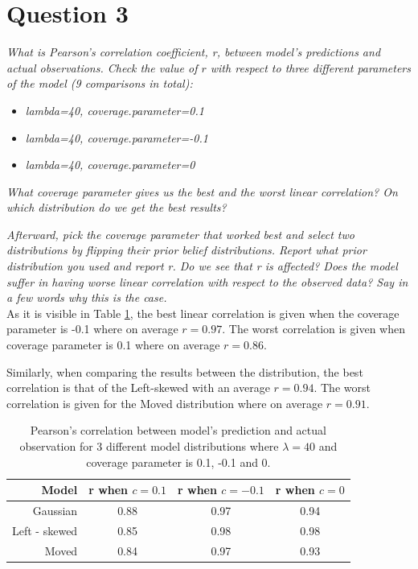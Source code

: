 \documentclass[11pt,a4paper,oneside]{article}
\begin{document}
\section{Question 3}
\label{Question 3}
\textit{What is Pearson’s correlation coefficient, r, between model’s predictions and actual observations. Check the value of $r$ with respect to three different parameters of the model (9 comparisons in total):}

\begin{itemize}
    \item \textit{lambda=40, coverage.parameter=0.1}
    \item \textit{lambda=40, coverage.parameter=-0.1}
    \item \textit{lambda=40, coverage.parameter=0}
\end{itemize}

\textit{What coverage parameter gives us the best and the worst linear correlation? On which distribution do we get the best results?}

\textit{Afterward, pick the coverage parameter that worked best and select two distributions by flipping their prior belief distributions. Report what prior distribution you used and report r. Do we see that r is affected? Does the model suffer in having worse linear correlation with respect to the observed data? Say in a few words why this is the case.}\\

As it is visible in Table \ref{question_3}, the best linear correlation is given when the coverage parameter is -0.1 where on average $r = 0.97$. The worst correlation is given when coverage parameter is 0.1 where on average $r = 0.86$.

Similarly, when comparing the results between the distribution, the best correlation is that of the Left-skewed with an average $r = 0.94$. The worst correlation is given for the Moved distribution where on average $r = 0.91$.

\begin{table}[ht]
\centering
\begin{tabular}{rccc}
  \hline
 Model & r when $c = 0.1$ & r when $c = -0.1$ & r when $c = 0$ \\ 
  \hline
    Gaussian & 0.88 & 0.97 & 0.94\\ 
    Left - skewed & 0.85 & 0.98 & 0.98\\ 
    Moved & 0.84 & 0.97 & 0.93\\ 
   \hline
\end{tabular}
\caption{Pearson's correlation between model's prediction and actual observation for 3 different model distributions where $\lambda = 40$ and coverage parameter is 0.1, -0.1 and 0.}
\label{question_3}
\end{table}
\end{document}
